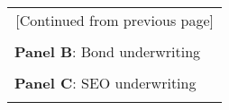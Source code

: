 		\begin{table}[H] \begin{center} 
		\begin{threeparttable} 
		\begin{tabular*}{\hsize}{@{\hskip\tabcolsep\extracolsep\fill}l*{5}{c}}
			 \multicolumn{6}{c}{[Continued from previous page]} \\ \\
			 \multicolumn{5}{l}{\textbf{Panel B}: Bond underwriting} \\
			\toprule  
				\def\sym#1{\ifmmode^{#1}\else\(^{#1}\)\fi}
				 
			\bottomrule \\
			\multicolumn{5}{l}{\textbf{Panel C}: SEO underwriting} \\
			\toprule  
				\def\sym#1{\ifmmode^{#1}\else\(^{#1}\)\fi}
				 
			\bottomrule \\
			\end{tabular*}
	\end{threeparttable} \end{center}
\end{table}
\clearpage \newpage

